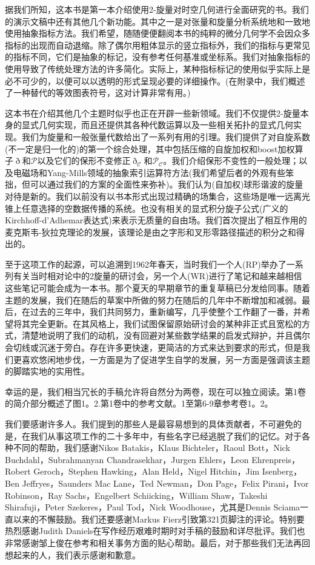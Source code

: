 \documentclass[utf8]{ctexbook}
\numberwithin{equation}{section}
\begin{document}
  据我们所知，这本书是第一本介绍使用2-旋量对时空几何进行全面研究的书。我们的演示文稿中还有其他几个新功能。其中之一是对张量和旋量分析系统地和一致地使用抽象指标方法。我们希望，随随便便翻阅本书的纯粹的微分几何学不会因众多指标的出现而自动退缩。除了偶尔用粗体显示的竖立指标外，我们的指标与更常见的指标不同，它们是抽象的标记，没有参考任何基准或坐标系。我们对抽象指标的使用导致了传统处理方法的许多简化。实际上，某种指标标记的使用似乎实际上是必不可少的，以便可以以透明的形式呈现必要的详细操作。(在附录中，我们概述了一种替代的等效图表符号，这对计算非常有用。)
  
  这本书在介绍其他几个主题时似乎也正在开辟一些新领域。我们不仅提供2-旋量本身的显式几何实现，而且还提供其各种代数运算以及一些相关拓扑的显式几何实现。我们为旋量和一般张量代数给出了一系列有用的引理。我们提供了对自旋系数(不一定是归一化的)的第一个综合处理，其中包括压缩的自旋加权和boost加权算子$\eth$和$\mathcal{P}$以及它们的保形不变修正$\eth_\mathscr{C}$和$\mathcal{P}_\mathscr{C}$。我们介绍保形不变性的一般处理；以及电磁场和Yang-Mills领域的抽象索引运算符方法(我们希望后者的外观有些笨拙，但可以通过我们的方案的全面性来弥补)。我们认为(自加权)球形谐波的旋量对待是新的。我们以前没有以书本形式出现过精确的场集合，这些场是唯一远离光锥上任意选择的空数据传播的系统。也没有相关的显式积分旋子公式(广义的Kirchhoff-d'Adhemar表达式)来表示无质量的自由场。我们首次提出了相互作用的麦克斯韦-狄拉克理论的发展，该理论是由之字形和叉形零路径描述的积分之和得出的。
  
  至于这项工作的起源，可以追溯到1962年春天，当时我们一个人(RP)举办了一系列有关当时相对论中的2旋量的研讨会，另一个人(WR)进行了笔记和越来越相信这些笔记可能会成为一本书。那个夏天的早期章节的重复草稿已分发给同事。随着主题的发展，我们在随后的草案中所做的努力在随后的几年中不断增加和减弱。最后，在过去的三年中，我们共同努力，重新编写，几乎使整个工作翻了一番，并希望将其完全更新。在其风格上，我们试图保留原始研讨会的某种非正式且宽松的方式，清楚地说明了我们的动机，没有回避对某些数学结果的启发式辩护，并且偶尔会切线或沉迷于旁白。存在许多更快速，更简洁的方式来达到要求的形式，但是我们更喜欢悠闲地步伐，一方面是为了促进学生自学的发展，另一方面是强调该主题的脚踏实地的实用性。
  
  幸运的是，我们相当冗长的手稿允许将自然分为两卷，现在可以独立阅读。第1卷的简介部分概述了图1。2.第1卷中的参考文献。1至第6-9章参考卷1。2。
  
  我们要感谢许多人。我们提到的那些人是最容易想到的具体贡献者，不可避免的是，在我们从事这项工作的二十多年中，有些名字已经逃脱了我们的记忆。对于各种不同的帮助，我们感谢Nikos Batakis，Klaus Bichteler，Raoul Bott，Nick Buchdahl，Subrahmanyan Chandrasekhar，Jurgen Ehlers，Leon Ehrenpreis，Robert Geroch，Stephen Hawking，Alan Held，Nigel Hitchin，Jim Isenberg，Ben Jeffryes，Saunders Mac Lane，Ted Newman，Don Page，Felix Pirani，Ivor Robinson，Ray Sachs，Engelbert Schiicking，William Shaw，Takeshi Shirafuji，Peter Szekeres，Paul Tod，Nick Woodhouse，尤其是Dennis Sciama一直以来的不懈鼓励。我们还要感谢Markus Fierz引致第321页脚注的评论。特别要热烈感谢Judith Daniels在写作经历艰难时期时对手稿的鼓励和详尽批评。我们也非常感谢邹上俊在参考和相关事务方面的贴心帮助。最后，对于那些我们无法再回想起来的人，我们表示感谢和歉意。
  
\end{document}

